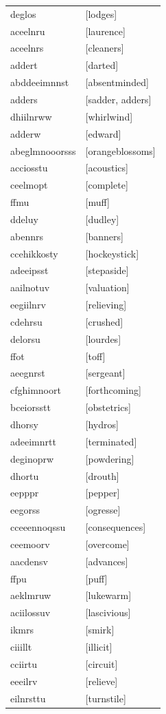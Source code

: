 \documentclass{article}
\begin{document}
\begin{tabular}{ll}
deglos & [lodges] \\
aceelnru & [laurence] \\
aceelnrs & [cleaners] \\
addert & [darted] \\
abddeeimnnst & [absentminded] \\
adders & [sadder, adders] \\
dhiilnrww & [whirlwind] \\
adderw & [edward] \\
abeglmnooorsss & [orangeblossoms] \\
acciosstu & [acoustics] \\
ceelmopt & [complete] \\
ffmu & [muff] \\
ddeluy & [dudley] \\
abennrs & [banners] \\
ccehikkosty & [hockeystick] \\
adeeipsst & [stepaside] \\
aailnotuv & [valuation] \\
eegiilnrv & [relieving] \\
cdehrsu & [crushed] \\
delorsu & [lourdes] \\
ffot & [toff] \\
aeegnrst & [sergeant] \\
cfghimnoort & [forthcoming] \\
bceiorsstt & [obstetrics] \\
dhorsy & [hydros] \\
adeeimnrtt & [terminated] \\
deginoprw & [powdering] \\
dhortu & [drouth] \\
eepppr & [pepper] \\
eegorss & [ogresse] \\
cceeennoqssu & [consequences] \\
ceemoorv & [overcome] \\
aacdensv & [advances] \\
ffpu & [puff] \\
aeklmruw & [lukewarm] \\
aciilossuv & [lascivious] \\
ikmrs & [smirk] \\
ciiillt & [illicit] \\
cciirtu & [circuit] \\
eeeilrv & [relieve] \\
eilnrsttu & [turnstile] \\

\end{tabular}
\end{document}
